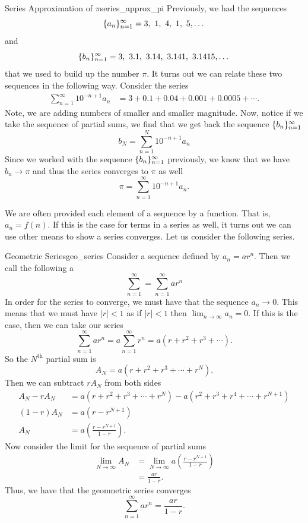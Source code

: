 \begin{ex}{Series Approximation of $\pi$}{series_approx_pi}
Previously, we had the sequences
\[
\{a_n\}_{n=1}^\infty = 3,~1,~4,~1,~5, \dots
\]
and
\[
\{b_n\}_{n=1}^\infty = 3,~3.1,~3.14,~3.141,~3.1415,\dots
\]
that we used to build up the number $\pi$.  It turns out we can relate these two sequences in the following way.  Consider the series
\begin{align*}
\sum_{n=1}^\infty 10^{-n+1} a_n &= 3+0.1+0.04+0.001+0.0005+\cdots.
\end{align*}
Note, we are adding numbers of smaller and smaller magnitude. Now, notice if we take the sequence of partial sums, we find that we get back the sequence $\{b_n\}_{n=1}^\infty$
\[
b_N = \sum_{n=1}^N 10^{-n+1}a_n
\]
Since we worked with the sequence $\{b_n\}_{n=1}^\infty$ previously, we know that we have $b_n\to \pi$ and thus the series converges to $\pi$ as well
\[
\pi = \sum_{n=1}^\infty 10^{-n+1}a_n.
\]
\end{ex}

We are often provided each element of a sequence by a function. That is, $a_n=f(n)$.  If this is the case for terms in a series as well, it turns out we can use other means to show a series converges.  Let us consider the following series.

\begin{ex}{Geometric Series}{geo_series}
Consider a sequence defined by $a_n = ar^n$.  Then we call the following a 
\[
\sum_{n=1}^\infty = \sum_{n=1}^\infty ar^n
\]
In order for the series to converge, we must have that the sequence $a_n \to 0$.  This means that we must have $|r|<1$ as if $|r|<1$ then $\lim_{n\to \infty} a_n =0$. If this is the case, then we can take our series
\[
\sum_{n=1}^\infty ar^n = a\sum_{n=1}^\infty r^n = a(r+r^2+r^3+\cdots).
\]
So the $N^\textrm{th}$ partial sum is
\[
A_{N} = a(r+r^2+r^3+\cdots+r^{N}).
\]
Then we can subtract $rA_N$ from both sides
\begin{align*}
A_N - rA_N &= a(r+r^2+r^3+\cdots+r^N) - a(r^2+r^3+r^4+\cdots+r^{N+1})\\
 (1-r)A_N&=a(r-r^{N+1})\\
 A_N &= a\left( \frac{r-r^{N+1}}{1-r}\right).
\end{align*}
Now consider the limit for the sequence of partial sums
\begin{align*}
\lim_{N\to \infty} A_N &= \lim_{N \to \infty} a\left(\frac{r-r^{N+1}}{1-r}\right)\\
&=\frac{ar}{1-r}.
\end{align*}
Thus, we have that the geomnetric series converges
\[
\boxed{\sum_{n=1}^\infty ar^n = \frac{ar}{1-r}.}
\]
\end{ex}

